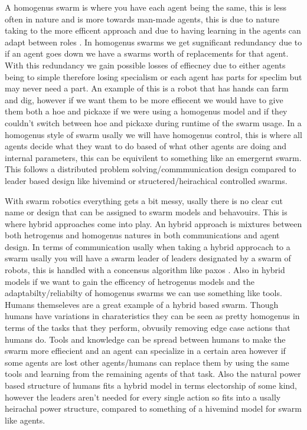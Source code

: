 \documentclass{UoYCSproject}
\begin{document}
A homogenus swarm is where you have each agent being the same, this is less often in nature and is more towards man-made agents, this is due to nature taking to the more efficent approach and due to having learning in the agents can adapt between roles \cite{Swarm robotics reviewed, Swarm intellegiegence}.
In homogenus swarms we get sugnificant redundancy due to if an agent goes down we have a swarms worth of replacements for that agent.
With this redundancy we gain possible losses of effiecney due to either agents being to simple therefore losing specialism or each agent has parts for speclim but may never need a part.
An example of this is a robot that has hands can farm and dig, however if we want them to be more effiecent we would have to give them both a hoe and pickaxe if we were using a homogenus model and if they couldn't switch between hoe and pickaxe during runtime of the swarm usage.
In a homogenus style of swarm usally we will have homogenus control, this is where all agents decide what they want to do based of what other agents are doing and internal parameters, this can be equivilent to something like an emergernt swarm.
This follows a distributed problem solving/commmunication design compared to  leader based design like hivemind or structered/heirachical controlled swarms.

With swarm robotics everything gets a bit messy, usally there is no clear cut name or design that can be assigned to swarm models and behavouirs.
This is where hybrid approaches come into play.
An hybrid approach is mixtures between both hetrogenus and homogenus natures in both communications and agent design. 
In terms of communication usally when taking a hybrid approcach to a swarm usally you will have a swarm leader of leaders designated by a swarm of robots, this is handled with a concensus algorithm like paxos \cite{paxos}.
Also in hybrid models if we want to gain the efficency of hetrogenus models and the adaptabilty/reliabilty of homogenus swarms we can use something like tools.
Humans themseleves are a great example of a hybrid based swarm.
Though humans have variations in charateristics they can be seen as pretty homogenus in terms of the tasks that they perform, obvusily removing edge case actions that humans do.
Tools and knowledge can be spread between humans to make the swarm more effiecient and an agent can specialize in a certain area however if some agents are lost other agents/humans can replace them by using the same tools and learning from the remaining agents of that task.
Also the natural power based structure of humans fits a hybrid model in terms electorship of some kind, however the leaders aren't needed for every single action so fits into a usally heirachal power structure, compared to something of a hivemind model for swarm like agents.
\end{document}
